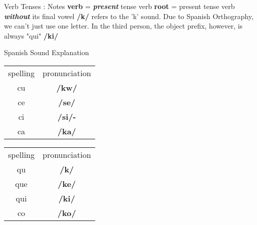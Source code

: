 \documentclass[12pt]{beamer}
\begin{document}
\begin{frame}
\begin{columns}[t]
    \begin{column}{.23\linewidth}
    	\begin{block}{Verb Tenses : Notes}
    		\textbf{verb} = \textbf{\textit{present}} tense verb \newline
    		\textbf{root} = present tense verb \textbf{\textit{without}} its final vowel \newline
    		\newline
    		\textbf{/k/} refers to the 'k' sound. Due to Spanish Orthography, we can't just use one letter. \newline
    		In the third person, the object prefix, however, is always "qui" \textbf{/ki/} \newline
    		\begin{center}
    			Spanish Sound Explanation
    		\end{center}
    		\begin{tabular}[t]{c|c|}
    			spelling & pronunciation \\
    			\cline{1-2}
    			cu & \textbf{/kw/} 	\\
    			ce & \textbf{/se/} 	\\
    			ci & \textbf{/si/-} \\
    			ca & \textbf{/ka/} 	\\
    		\end{tabular}%
	    	\begin{tabular}[t]{c|c}
	    		spelling & pronunciation \\
	    		\cline{1-2}
	    		qu & \textbf{/k/} \\
	    		que & \textbf{/ke/} \\
	    		qui & \textbf{/ki/}  \\
	    		co & \textbf{/ko/} 	\\
	    	\end{tabular}%
    		\newline
    	

\end{block}
\end{column}
\end{columns}
\end{frame}
\end{document}
